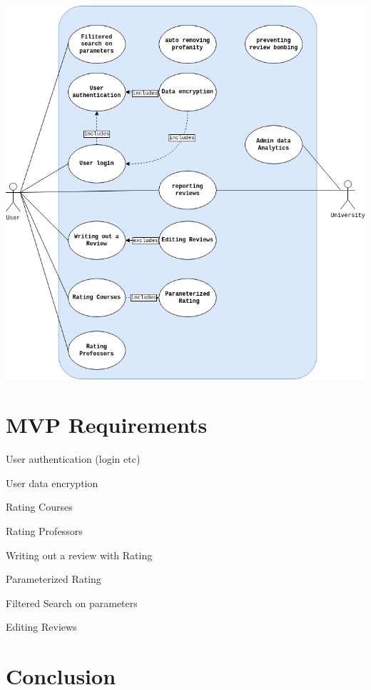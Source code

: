 \documentclass{article}
\begin{document}
\begin{center}
	\includegraphics[scale=0.5]{./USECASE.drawio.png}	
\end{center}

\section{MVP Requirements}

	\quad User authentication (login etc)

	\quad User data encryption

	\quad Rating Courses

	\quad Rating Professors

	\quad Writing out a review with Rating

	\quad Parameterized Rating

	\quad Filtered Search on parameters	

	\quad Editing Reviews




\section{Conclusion}
\end{document}

